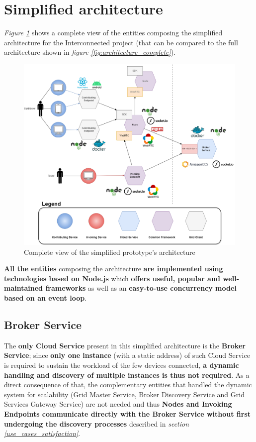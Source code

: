 \section{Simplified architecture}
\textit{Figure \ref{fig:simplified_architecture}} shows a complete view of the entities composing the simplified architecture for the Interconnected project (that can be compared to the full architecture shown in \textit{figure \ref{fig:architecture_complete}}).

\begin{figure}[!ht]
    \centering
    \includegraphics[width=\linewidth]{document/chapters/chapter_6/images/simplified_architecture.png}
    \caption{Complete view of the simplified prototype's architecture}
    \label{fig:simplified_architecture}
\end{figure}

\vspace{10mm}

\textbf{All the entities} composing the architecture \textbf{are implemented using technologies based on Node.js} which \textbf{offers useful, popular and well-maintained frameworks} as well as an \textbf{easy-to-use concurrency model based on an event loop}.

\subsection{Broker Service}
The \textbf{only Cloud Service} present in this simplified architecture is the \textbf{Broker Service}; since \textbf{only one instance} (with a static address) of such Cloud Service is required to sustain the workload of the few devices connected, \textbf{a dynamic handling and discovery of multiple instances is thus not required}. As a direct consequence of that, the complementary entities that handled the dynamic system for scalability (Grid Master Service, Broker Discovery Service and Grid Services Gateway Service) are not needed and thus \textbf{Nodes and Invoking Endpoints communicate directly with the Broker Service without first undergoing the discovery processes} described in \textit{section \ref{use_cases_satisfaction}}.

